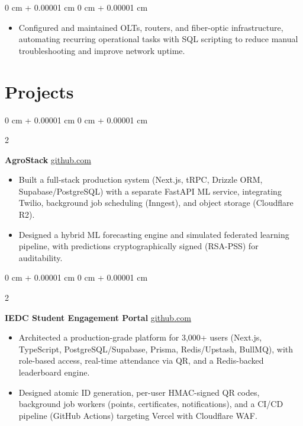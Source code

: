\documentclass[10pt, a4paper]{article}
\newenvironment{highlights}{
    \begin{itemize}[
        topsep=0.10 cm,
        parsep=0.10 cm,
        partopsep=0pt,
        itemsep=0pt,
        leftmargin=0 cm + 10pt
    ]
}{
    \end{itemize}
} %
\newenvironment{onecolentry}{
    \begin{adjustwidth}{
        0 cm + 0.00001 cm
    }{
        0 cm + 0.00001 cm
    }
}{
    \end{adjustwidth}
} %
\newenvironment{twocolentry}[2][]{
    \onecolentry
    \def\secondColumn{#2}
    \setcolumnwidth{\fill, 4.5 cm}
    \begin{paracol}{2}
}{
    \switchcolumn \raggedleft \secondColumn
    \end{paracol}
    \endonecolentry
} %
\begin{document}
\vspace{0.10 cm}
\begin{onecolentry}
    \begin{highlights}
        \item Configured and maintained OLTs, routers, and fiber-optic infrastructure, automating recurring operational tasks with SQL scripting to reduce manual troubleshooting and improve network uptime.
    \end{highlights}
\end{onecolentry}

    \section{Projects}

        \begin{twocolentry}{
            \href{https://github.com/TimsTittus/AgroStack}{\underline{github.com}}
        }
            \textbf{AgroStack}\end{twocolentry}

        \vspace{0.01 cm}

            \begin{highlights}
                \item Built a full-stack production system (Next.js, tRPC, Drizzle ORM, Supabase/PostgreSQL) with a separate FastAPI ML service, integrating Twilio, background job scheduling (Inngest), and object storage (Cloudflare R2).
                \item Designed a hybrid ML forecasting engine and simulated federated learning pipeline, with predictions cryptographically signed (RSA-PSS) for auditability.
            \end{highlights}

        \vspace{0.01 cm}

            \begin{twocolentry}{
            \href{https://github.com/TimsTittus/Portal}{\underline{github.com}}
        }
            \textbf{IEDC Student Engagement Portal}\end{twocolentry}

        \vspace{0.01 cm}

            \begin{highlights}
                \item Architected a production-grade platform for 3,000+ users (Next.js, TypeScript, PostgreSQL/Supabase, Prisma, Redis/Upstash, BullMQ), with role-based access, real-time attendance via QR, and a Redis-backed leaderboard engine.
                \item Designed atomic ID generation, per-user HMAC-signed QR codes, background job workers (points, certificates, notifications), and a CI/CD pipeline (GitHub Actions) targeting Vercel with Cloudflare WAF.
            \end{highlights}
\end{document}
